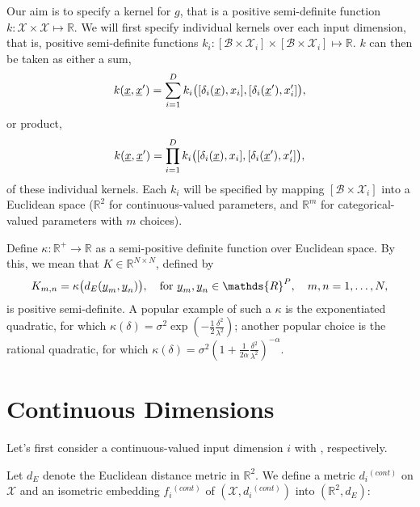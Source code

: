 \documentclass[letterpaper]{article}
\newcommand{\vect}[1]{\underline{\smash{#1}}}
\renewcommand{\v}[1]{\vect{#1}}
\newcommand{\reals}{\mathds{R}}
\newcommand{\sX}{\mathcal{X}}
\begin{document}
Our aim is to specify a kernel for $g$, that is a positive semi-definite function  $k\colon \sX \times \sX \mapsto \reals$. We will first specify individual kernels over each input dimension, that is, positive semi-definite functions $k_i\colon [\mathcal{B} \times \sX_i] \times [\mathcal{B} \times \sX_i] \mapsto \reals$. $k$ can then be taken as either a sum,
\begin{equation}
 k(\v{x}, \v{x}') = \sum_{i=1}^D k_i\bigl([\delta_i(\v{x}), x_i], [\delta_i(\v{x}'), x_i']\bigr),
\end{equation}
or product,
\begin{equation}
 k(\v{x}, \v{x}') = \prod_{i=1}^D k_i\bigl([\delta_i(\v{x}), x_i], [\delta_i(\v{x}'), x_i']\bigr),
\end{equation}
of these individual kernels. Each $k_i$ will be specified by mapping $[\mathcal{B} \times \sX_i]$ into a Euclidean space ($\reals^2$ for continuous-valued parameters, and $\reals^m$ for categorical-valued parameters with $m$ choices). 

Define $\kappa\colon \reals^+ \to \reals$ as a semi-positive definite function over Euclidean space. By this, we mean that $K \in \reals^{N\times N}$, defined by 
\begin{equation}
 K_{m, n} = \kappa\bigl(d_E(\v{y}_m, \v{y}_n)\bigr),\quad \text{for }
\v{y}_m, \v{y}_n \in \reals^P,\quad m, n = 1, \ldots, N, 
\end{equation}
is positive semi-definite. A popular example of such a $\kappa$ is the exponentiated quadratic, for which $\kappa(\delta) = \sigma^2 \exp(-\frac{1}{2} \frac{\delta^2}{\lambda^2})$; another popular choice is the rational quadratic, for which $\kappa(\delta) = \sigma^2 (1+\frac{1}{2\alpha} \frac{\delta^2}{\lambda^2})^{-\alpha}$.


\section{Continuous Dimensions}

Let's first consider a continuous-valued input dimension $i$ with , respectively. 

Let $d{_E}$ denote the Euclidean distance metric in $\reals^{2}$. We define a metric $d{_i}^{(cont)}$ on $\sX$ and an isometric embedding $f{_i}^{(cont)}$ of $(\sX, d{_i}^{(cont)})$ into $(\reals^{2},d_E)$:
\end{document}
